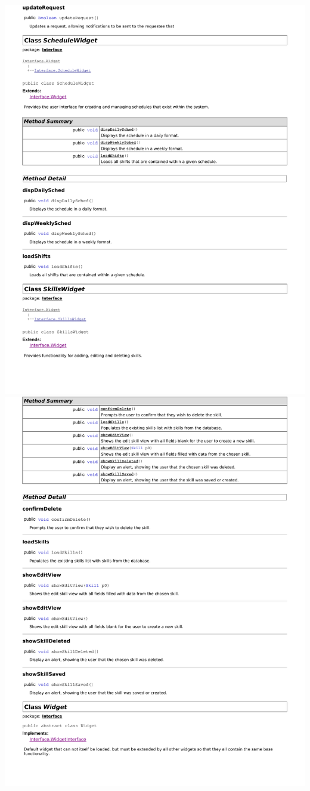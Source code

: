 \documentclass[letterpaper,12pt]{report}
\begin{document}
\newpage
\includegraphics[scale=0.9,trim=20mm 30mm 25mm 5mm]{externals/di10.pdf}
\newpage
\includegraphics[scale=0.9,trim=20mm 30mm 25mm 5mm]{externals/di11.pdf}
\end{document}
